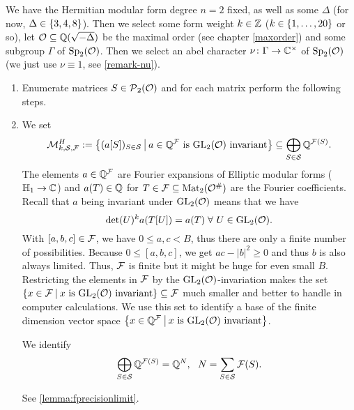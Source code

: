 \begin{algo}
\label{main-algo}
We have the Hermitian modular form degree $n = 2$ fixed, as well as some $\Delta$ (for now, $\Delta \in \Set{3,4,8}$). Then we select some form weight $k \in \mathbb{Z}$ ($k \in \Set{1,\dots,20}$ or so), let $\mathcal{O} \subseteq \mathbb{Q}(\sqrt{-\Delta})$ be the maximal order (see chapter \ref{maxorder}) and some subgroup $\Gamma$ of $\operatorname{Sp}_2(\mathcal{O})$. Then we select an abel character $\nu \colon \Gamma \rightarrow \mathbb{C}^\times$ of $\operatorname{Sp}_2(\mathcal{O})$ (we just use $\nu \equiv 1$, see \cref{remark-nu}).

\begin{enumerate}
\item\label{NextSStep} Enumerate matrices $S \in \operatorname{\mathcal{P}}_2(\mathcal{O})$ and for each matrix perform the following steps.


\item
We set
\[ \mathcal{M}_{k,\mathcal{S},\F}^H := \Set{ (a [S])_{S\in\mathcal{S}} }{\text{$a \in \Q^\F$ is $\GL_2(\curlO)$ invariant}} \subseteq \bigoplus_{S\in\mathcal{S}} \Q^{\FPrecisionLimit{S}} . \]
The elements $a \in \mathbb{Q}^{\mathcal{F}}$ are Fourier expansions of Elliptic modular forms ($\mathbb{H}_1 \rightarrow \mathbb{C}$) and $a(T) \in \mathbb{Q}$ for $T \in \mathcal{F} \subseteq \operatorname{Mat}_2(\mathcal{O}^\#)$ are the Fourier coefficients.
Recall that $a$ being invariant under $\operatorname{GL}_2(\mathcal{O})$ means that we have
\[ \det(U)^k a(T[U]) = a(T) \; \forall\ U \in \operatorname{GL}_2(\mathcal{O}) . \]
With $[a,b,c] \in \mathcal{F}$, we have $0\le a,c<B$, thus there are only a finite number of possibilities. Because $0 \le [a,b,c]$, we get $ac - \left| b \right|^2 \ge 0$ and thus $b$ is also always limited. Thus, $\mathcal{F}$ is finite but it might be huge for even small $B$. %
Restricting the elements in $\mathcal{F}$ by the $\operatorname{GL}_2(\mathcal{O})$-invariation makes the set $\invar{\F}{\GL_2(\curlO)} \subseteq \F$ much smaller and better to handle in computer calculations. We use this set to identify a base of the finite dimension vector space $\invar{\Q^\F}{\GL_2(\curlO)}$.

We identify
\[ \bigoplus_{S\in\mathcal{S}} \mathbb{Q}^{\mathcal{F}(S)} = \mathbb{Q}^N, \ \ N = \sum_{S\in\mathcal{S}} \mathcal{F}(S) . \]

See \cref{lemma:fprecisionlimit}.


\end{enumerate}
\end{algo}
